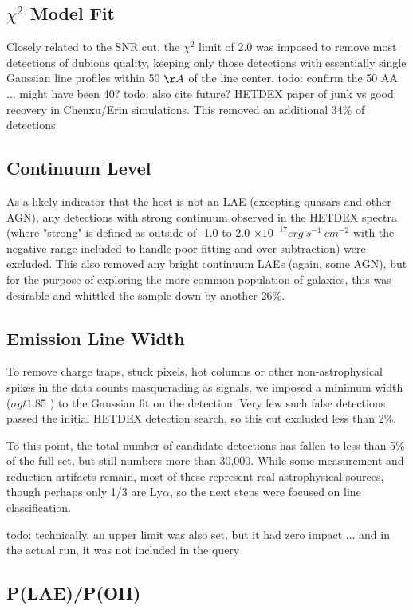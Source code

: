 \documentclass{aastex62}
\begin{document}
\subsection{$\chi^{2}$ Model Fit}
Closely related to the SNR cut, the $\chi^{2}$ limit of 2.0 was imposed to remove most detections of dubious quality, keeping only those detections with essentially single Gaussian line profiles within 50 $\AA$ of the line center.  { \color{red} todo: confirm the 50 AA ... might have been 40?} { \color{red} todo: also cite future? HETDEX paper of junk vs good recovery in Chenxu/Erin simulations}. This removed an additional 34\% of detections.

\subsection{Continuum Level}
As a likely indicator that the host is not an LAE (excepting quasars and other AGN), any detections with strong continuum observed in the HETDEX spectra (where "strong" is defined as outside of -1.0 to 2.0 $\times 10^{-17} erg\ s^{-1}\ cm^{-2}$ with the negative range included to handle poor fitting and over subtraction) were excluded. This also removed any bright continuum LAEs (again, some AGN), but for the purpose of exploring the more common population of galaxies, this was desirable and whittled the sample down by another 26\%. 

\subsection{Emission Line Width}
To remove charge traps, stuck pixels, hot columns or other non-astrophysical spikes in the data counts masquerading as signals, we imposed a minimum width ($\sigma gt 1.85$ ) to the Gaussian fit on the detection. Very few such false detections passed the initial HETDEX detection search, so this cut excluded less than 2\%. 

To this point, the total number of candidate detections has fallen to less than 5\% of the full set, but still numbers more than 30,000. While some measurement and reduction artifacts remain, most of these represent real astrophysical sources, though perhaps only 1/3 are Ly$\alpha$, so the next steps were focused on line classification. 

{ \color{red} todo: technically, an upper limit was also set, but it had zero impact ... and in the actual run, it was not included in the query}


\subsection{P(LAE)/P(OII)}
\end{document}
